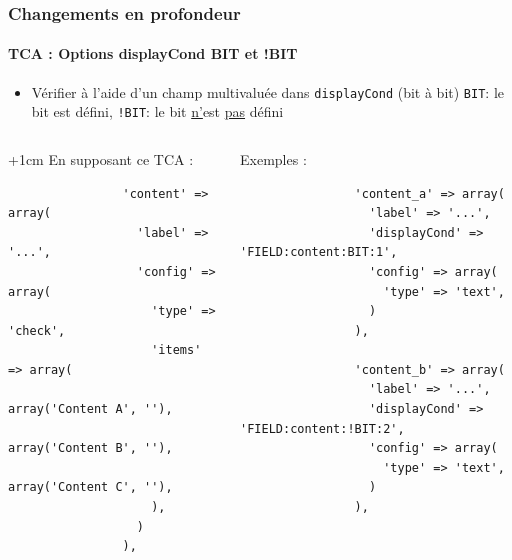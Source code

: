 
\begin{frame}[fragile]
	\frametitle{Changements en profondeur}
	\framesubtitle{TCA : Options displayCond BIT et !BIT}

	\lstset{
		basicstyle=\tiny\ttfamily
	}

	\begin{itemize}
		\item Vérifier à l'aide d'un champ multivaluée dans \texttt{displayCond} (bit à bit)\newline
			\texttt{BIT}: le bit est défini, \texttt{!BIT}: le bit \underline{n'}est \underline{pas} défini
	\end{itemize}

	\begin{columns}[T]

		\begin{column}{.5\textwidth}

			\advance\leftskip+1cm
			En supposant ce TCA :

			\lstset{xleftmargin=1cm}

			\begin{lstlisting}
				'content' => array(
				  'label' => '...',
				  'config' => array(
				    'type' => 'check',
				    'items' => array(
				      array('Content A', ''),
				      array('Content B', ''),
				      array('Content C', ''),
				    ),
				  )
				),
			\end{lstlisting}

		\end{column}
		\begin{column}{.5\textwidth}

			Exemples :

			\begin{lstlisting}
				'content_a' => array(
				  'label' => '...',
				  'displayCond' => 'FIELD:content:BIT:1',
				  'config' => array(
				    'type' => 'text',
				  )
				),

				'content_b' => array(
				  'label' => '...',
				  'displayCond' => 'FIELD:content:!BIT:2',
				  'config' => array(
				    'type' => 'text',
				  )
				),
			\end{lstlisting}
		\end{column}

	\end{columns}

\end{frame}

